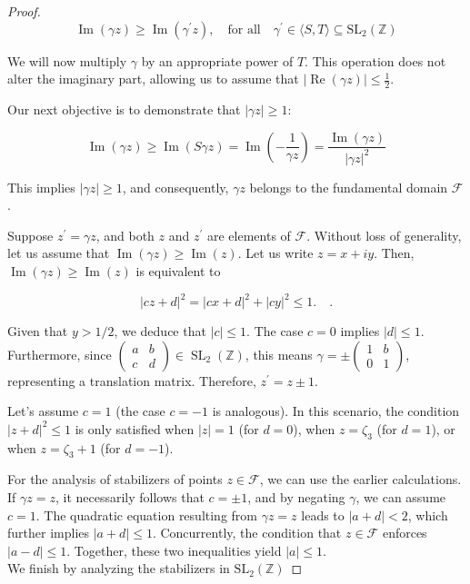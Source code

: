 \begin{proposition}
\begin{proof}
$$
\operatorname{Im}(\gamma z) \geq \operatorname{Im}\left(\gamma^{\prime} z\right), \quad \text{for all} \quad \gamma^{\prime} \in\langle S, T\rangle \subseteq \mathrm{SL}_{2}(\mathbb{Z})
$$

We will now multiply $\gamma$ by an appropriate power of $T$. This operation does not alter the imaginary part, allowing us to assume that $|\operatorname{Re}(\gamma z)| \leq \frac{1}{2}$. 

Our next objective is to demonstrate that $|\gamma z| \geq 1$:

$$
\operatorname{Im}(\gamma z) \geq \operatorname{Im}(S \gamma z)=\operatorname{Im}\left(-\frac{1}{\gamma z}\right)=\frac{\operatorname{Im}(\gamma z)}{|\gamma z|^{2}}
$$

This implies $|\gamma z| \geq 1$, and consequently, $\gamma z$ belongs to the fundamental domain $\mathcal{F}$.

Suppose $z^{\prime}=\gamma z$, and both $z$ and $z^{\prime}$ are elements of $\mathcal{F}$. Without loss of generality, let us assume that $\operatorname{Im}(\gamma z) \geq \operatorname{Im}(z)$. Let us write $z=x+iy$. Then,  $\operatorname{Im}(\gamma z) \geq \operatorname{Im}(z)$ is equivalent to

$$
|c z+d|^{2}=|c x+d|^{2}+|c y|^{2} \leq 1 . \quad.
$$

Given that $y>1 / 2$, we deduce that $|c| \leq 1$. The case $c=0$ implies $|d| \leq 1$. Furthermore, since $\begin{pmatrix} a & b \\ c & d \end{pmatrix} \in \operatorname{SL}_{2}(\mathbb{Z})$, this means $\gamma= \pm\begin{pmatrix} 1 & b \\ 0 & 1 \end{pmatrix}$, representing a translation matrix. Therefore, $z^{\prime}=z \pm 1$.

Let's assume $c=1$ (the case $c=-1$ is analogous). In this scenario, the condition $|z+d|^{2} \leq 1$ is only satisfied when $|z|=1$ (for $d=0$), when $z=\zeta_3$ (for $d=1$), or when $z=\zeta_3+1$ (for $d=-1$).

For the analysis of stabilizers of points $z \in \mathcal{F}$, we can use the earlier calculations. If $\gamma z=z$, it necessarily follows that $c= \pm 1$, and by negating $\gamma$, we can assume $c=1$. The quadratic equation resulting from $\gamma z=z$ leads to $|a+d|<2$, which further implies $|a+d| \leq 1$. Concurrently, the condition that $z \in \mathcal{F}$ enforces $|a-d| \leq 1$. 
Together, these two inequalities yield $|a| \leq 1$. \\ 
We finish by analyzing the stabilizers in \( \mathrm{SL}_{2}(\mathbb{Z}) \)


\end{proof}
\end{proposition}
